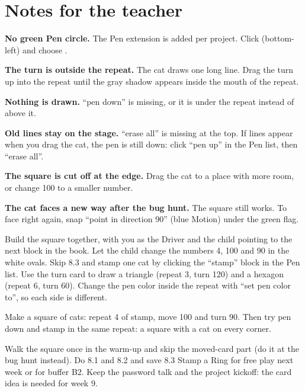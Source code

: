 \section{Notes for the teacher}
\begin{commonmistakes}
  \item \textbf{No green Pen circle.} The Pen extension is added per project. Click  (bottom-left) and choose .
  \item \textbf{The turn is outside the repeat.} The cat draws one long line. Drag the turn up into the repeat until the gray shadow appears inside the mouth of the repeat.
  \item \textbf{Nothing is drawn.} \enquote{pen down} is missing, or it is under the repeat instead of above it.
  \item \textbf{Old lines stay on the stage.} \enquote{erase all} is missing at the top. If lines appear when you drag the cat, the pen is still down: click \enquote{pen up} in the Pen list, then \enquote{erase all}.
  \item \textbf{The square is cut off at the edge.} Drag the cat to a place with more room, or change 100 to a smaller number.
  \item \textbf{The cat faces a new way after the bug hunt.} The square still works. To face right again, snap \enquote{point in direction 90} (blue Motion) under the green flag.
\end{commonmistakes}

\begin{differentiation}
\supportpath Build the square together, with you as the Driver and the child pointing to the next block in the book. Let the child change the numbers 4, 100 and 90 in the white ovals. Skip 8.3 and stamp one cat by clicking the \enquote{stamp} block in the Pen list.
\extensionpath Use the turn card to draw a triangle (repeat 3, turn 120) and a hexagon (repeat 6, turn 60). Change the pen color inside the repeat with \enquote{set pen color to}, so each side is different.
\end{differentiation}

\begin{stretchchallenge}
Make a square of cats: repeat 4 of stamp, move 100 and turn 90. Then try pen down and stamp in the same repeat: a square with a cat on every corner.
\end{stretchchallenge}

\begin{teachernote}
Walk the square once in the warm-up and skip the moved-card part (do it at the bug hunt instead). Do 8.1 and 8.2 and save 8.3 Stamp a Ring for free play next week or for buffer B2. Keep the password talk and the project kickoff: the card idea is needed for week 9.
\end{teachernote}
